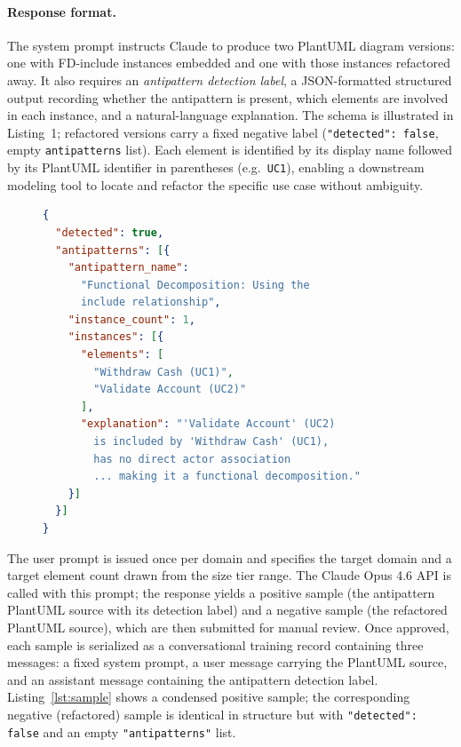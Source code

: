 \documentclass[sigconf,review,anonymous]{acmart}
\begin{document}
\paragraph{Response format.}
The system prompt instructs Claude to produce two PlantUML diagram
versions: one with FD-include instances embedded and one with those
instances refactored away.  It also requires an \emph{antipattern detection label}, a JSON-formatted
structured output recording whether the antipattern is present, which elements are
involved in each instance, and a natural-language explanation.  The schema
is illustrated in Listing~1; refactored versions carry a fixed negative label
(\texttt{"detected": false}, empty \texttt{antipatterns} list).  Each element is identified by its display name followed by its PlantUML identifier in parentheses (e.g.\ \texttt{UC1}), enabling a downstream modeling tool to locate and refactor the specific use case without ambiguity.

\begin{figure}[h]
\begin{lstlisting}[language=json,
  caption={Example antipattern detection label for a Banking System.},
  label={lst:json}]
{
  "detected": true,
  "antipatterns": [{
    "antipattern_name":
      "Functional Decomposition: Using the
      include relationship",
    "instance_count": 1,
    "instances": [{
      "elements": [
        "Withdraw Cash (UC1)",
        "Validate Account (UC2)"
      ],
      "explanation": "'Validate Account' (UC2)
        is included by 'Withdraw Cash' (UC1),
        has no direct actor association
        ... making it a functional decomposition."
    }]
  }]
}
\end{lstlisting}
\end{figure}

The user prompt is issued once per domain and specifies the target
domain and a target element count drawn from the size tier range.
The Claude Opus 4.6 API is called with
this prompt; the response yields a positive sample (the antipattern PlantUML
source with its detection label) and a negative sample (the refactored
PlantUML source), which are then submitted for manual review.
Once approved, each sample is serialized as a conversational training record
containing three messages: a fixed system prompt, a user message carrying the
PlantUML source, and an assistant message containing the antipattern detection
label.  Listing~\ref{lst:sample} shows a condensed positive sample; the
corresponding negative (refactored) sample is identical in structure but with
\texttt{"detected": false} and an empty \texttt{"antipatterns"} list.
\end{document}

